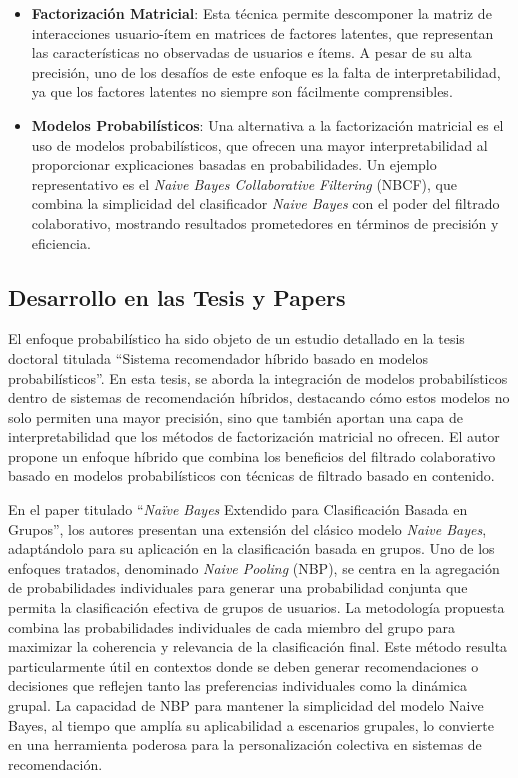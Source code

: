 \documentclass[runningheads,a4paper]{llncs}
\begin{document}
\begin{itemize}
    \item \textbf{Factorización Matricial}: Esta técnica permite descomponer la matriz de interacciones usuario-ítem en matrices de factores latentes, que representan las características no observadas de usuarios e ítems. A pesar de su alta precisión, uno de los desafíos de este enfoque es la falta de interpretabilidad, ya que los factores latentes no siempre son fácilmente comprensibles.\cite{tesis_sistema_recomendador_hibrido}

    \item \textbf{Modelos Probabilísticos}: Una alternativa a la factorización matricial es el uso de modelos probabilísticos, que ofrecen una mayor interpretabilidad al proporcionar explicaciones basadas en probabilidades. Un ejemplo representativo es el \textit{Naive Bayes Collaborative Filtering} (NBCF), que combina la simplicidad del clasificador \textit{Naive Bayes} con el poder del filtrado colaborativo, mostrando resultados prometedores en términos de precisión y eficiencia.\cite{tesis_sistema_recomendador_hibrido}
\end{itemize}

\subsection{Desarrollo en las Tesis y Papers}

El enfoque probabilístico ha sido objeto de un estudio detallado en la tesis doctoral titulada 
``Sistema recomendador híbrido basado en modelos probabilísticos''\cite{tesis_sistema_recomendador_hibrido}. En esta tesis, se aborda la integración de modelos probabilísticos dentro de sistemas de recomendación híbridos, destacando cómo estos modelos no solo permiten una mayor precisión, sino que también aportan una capa de interpretabilidad que los métodos de factorización matricial no ofrecen. El autor propone un enfoque híbrido que combina los beneficios del filtrado colaborativo basado en modelos probabilísticos con técnicas de filtrado basado en contenido.

En el paper titulado ``\textit{Naïve 
Bayes} Extendido para Clasificación Basada en Grupos''\cite{nbp}, los autores presentan una extensión del clásico modelo \textit{Naive Bayes}, adaptándolo para su aplicación en la clasificación basada en grupos. Uno de los enfoques tratados, denominado \textit{Naive Pooling} (NBP), se centra en la agregación de probabilidades individuales para generar una probabilidad conjunta que permita la clasificación efectiva de grupos de usuarios. La metodología propuesta combina las probabilidades individuales de cada miembro del grupo para maximizar la coherencia y relevancia de la clasificación final. Este método resulta particularmente útil en contextos donde se deben generar recomendaciones o decisiones que reflejen tanto las preferencias individuales como la dinámica grupal. La capacidad de NBP para mantener la simplicidad del modelo Naive Bayes, al tiempo que amplía su aplicabilidad a escenarios grupales, lo convierte en una herramienta poderosa para la personalización colectiva en sistemas de recomendación.
\end{document}
